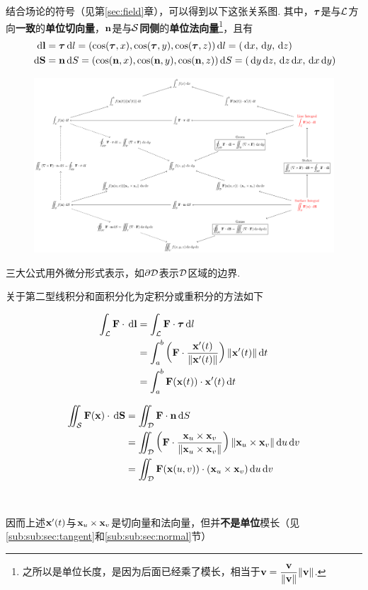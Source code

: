 结合场论的符号（见第\ref{sec:field}章），可以得到以下这张关系图.
其中，$\bm{\tau}$是与$\mathcal{L}$方向\textbf{一致}的\textbf{单位切向量}，$\mathbf{n}$是与$\mathcal{S}$\textbf{同侧}的\textbf{单位法向量}\footnote{之所以是单位长度，是因为后面已经乘了模长，相当于$\mathbf{v}=\dfrac{\mathbf{v}}{\|\mathbf{v}\|}\|\mathbf{v}\|$.}，且有
\[\begin{aligned}
\,\mathrm{d}\mathbf{l}&=\bm{\tau}\,\mathrm{d} l=(\cos(\bm{\tau},x),\cos(\bm{\tau},y),\cos(\bm{\tau},z))\,\mathrm{d} l=(\,\mathrm{d} x,\,\mathrm{d} y,\,\mathrm{d} z)\\
\,\mathrm{d}\mathbf{S}&=\mathbf{n}\,\mathrm{d} S=(\cos(\mathbf{n},x),\cos(\mathbf{n},y),\cos(\mathbf{n},z))\,\mathrm{d} S=(\,\mathrm{d} y\,\mathrm{d} z,\,\mathrm{d} z\,\mathrm{d} x,\,\mathrm{d} x\,\mathrm{d} y)
\end{aligned}\]
\begin{figure}[H]
\centering
\includegraphics[width=\linewidth]{fig/multivar-integral-relationship.pdf}
\end{figure}
\par 三大公式用外微分形式表示，如$\partial\mathcal{D}$表示$\mathcal{D}$区域的边界.
\par 关于第二型线积分和面积分化为定积分或重积分的方法如下
\\
\begin{minipage}[H]{0.5\linewidth}
\[\begin{aligned}
\int_{\mathcal{L}}\mathbf{F}\cdot\,\mathrm{d}\mathbf{l}&=\int_{\mathcal{L}}\mathbf{F}\cdot\bm{\tau}\,\mathrm{d} l\\
&=\int_a^b\left(\mathbf{F}\cdot\frac{\mathbf{x}'(t)}{\|\mathbf{x}'(t)\|}\right)\|\mathbf{x}'(t)\|\,\mathrm{d} t\\
&=\int_a^b\mathbf{F}(\mathbf{x}(t))\cdot\mathbf{x}'(t)\,\mathrm{d} t
\end{aligned}\]
\end{minipage}
\begin{minipage}[H]{0.5\linewidth}
\[\begin{aligned}
\iint_{\mathcal{S}}\mathbf{F}(\mathbf{x})\cdot\,\mathrm{d}\mathbf{S}&=\iint_{\mathcal{D}} \mathbf{F}\cdot\mathbf{n}\,\mathrm{d} S\\
&=\iint_{\mathcal{D}} \left(\mathbf{F}\cdot\frac{\mathbf{x}_u\times\mathbf{x}_v}{\|\mathbf{x}_u\times\mathbf{x}_v\|}\right)\|\mathbf{x}_u\times\mathbf{x}_v\|\,\mathrm{d} u\,\mathrm{d} v\\
&=\iint_{\mathcal{D}} \mathbf{F}(\mathbf{x}(u,v))\cdot(\mathbf{x}_u\times\mathbf{x}_v)\,\mathrm{d} u\,\mathrm{d} v
\end{aligned}\]
\end{minipage}
\\
\par 因而上述$\mathbf{x}'(t)$与$\mathbf{x}_u\times\mathbf{x}_v$是切向量和法向量，但并\textbf{不是单位}模长（见\ref{sub:sub:sec:tangent}和\ref{sub:sub:sec:normal}节）

